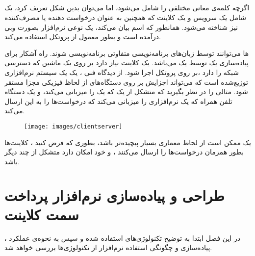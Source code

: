 \documentclass[oneside]{report}
\begin{document}
	\section{{\large{}}}
اگرچه کلمه‌ی 
{\normalsize{}}
معانی مختلفی را شامل می‌شود، اما می‌توان بدین شکل تعریف کرد، یک 
{\normalsize{}}
شامل یک سرویس و یک کلاینت که همچنین به عنوان درخواست دهنده یا مصرف‌کننده نیز شناخته می‌شود. همانطور که  اسم 
{\normalsize{}}
بیان می‌کند، یک 
{\normalsize{}}
نوعی نرم‌افزار بصورت وبی درآمده است و بطور معمول از پروتکل 
{\normalsize{}}
استفاده می‌کند. 
		
		{\normalsize{}} ها
		می‌توانند توسط زبان‌های برنامه‌نویسی متفاوتی برنامه‌نویسی شوند. راه آشکار برای پیاده‌سازی یک 
		{\normalsize{}}
		توسط یک 
		{\normalsize{}}
		می‌باشد. یک کلاینت 
		{\normalsize{}}
	نیاز دارد بر روی یک ماشین که دسترسی شبکه را دارد ،بر روی پروتکل
			{\normalsize{}}
			اجرا شود. از دیدگاه فنی ، یک
					{\normalsize{}} 
			یک سیستم نرم‌افزاری توزیع‌شده است که می‌تواند اجزایش بر روی دستگاه‌های از لحاظ فیزیکی مجزا مستقر شود. 
			مثالی را در نظر بگیرید که متشکل از یک 
					{\normalsize{}}
	که یک 
			{\normalsize{}}
			را میزبانی می‌کند، و یک دستگاه تلفن همراه که یک نرم‌افزاری را میزبانی می‌کند که درخواست‌ها را به این 
					{\normalsize{}}
					ارسال می‌‌کند. 
					\begin{figure}[h]
						\centering
						\texttt{[image: images/clientserver]}
						\caption{}
						\label{fig:clientserver}
					\end{figure}
یک 
		{\normalsize{}}
		ممکن است از لحاظ معماری بسیار پیچیده‌تر باشد، بطوری که فرض کنید ، کلاینت‌ها بطور همزمان درخواست‌ها را ارسال می‌کنند ، و خود 
				{\normalsize{}}
				امکان دارد متشکل از چند 
						{\normalsize{}}
						دیگر باشد. 					
					
		
		
		
		
		
		
		
		
		\chapter{طراحی و پیاده‌سازی نرم‌افزار پرداخت سمت کلاینت}\label{clientimplementation}
در این فصل ابتدا به توضیح تکنولوژی‌های استفاده شده و سپس به نحوه‌ی عملکرد ، پیاده‌سازی و چگونگی استفاده نرم‌افزار از تکنولوژی‌ها بررسی خواهد شد.
\end{document}
